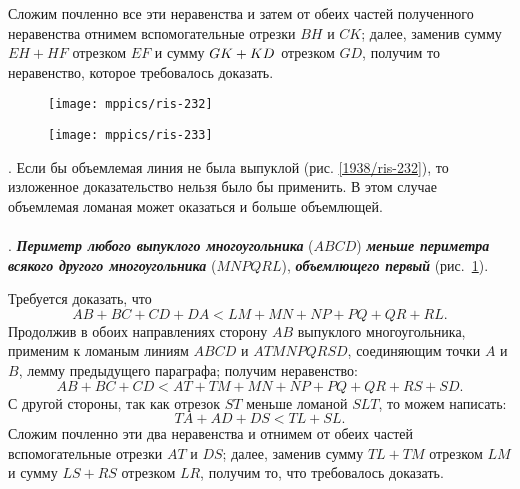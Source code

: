 Сложим почленно все эти неравенства и затем от обеих частей полученного неравенства отнимем вспомогательные отрезки $BH$ и $CK$;
далее, заменив сумму $EH+HF$ отрезком $EF$ и сумму $GK\z+KD$ отрезком $GD$, получим то неравенство, которое требовалось доказать.

\begin{figure}[h!]
\begin{minipage}{.48\textwidth}
\centering
\texttt{[image: mppics/ris-232]}
\end{minipage}\hfill
\begin{minipage}{.48\textwidth}
\centering
\texttt{[image: mppics/ris-233]}
\end{minipage}

\medskip

\begin{minipage}{.48\textwidth}
\centering
\caption{}\label{1938/ris-232}
\end{minipage}\hfill
\begin{minipage}{.48\textwidth}
\centering
\caption{}\label{1938/ris-233}
\end{minipage}
\vskip-4mm
\end{figure}

\smallskip
\mbox{.}
Если бы объемлемая линия не была выпуклой (рис. \ref{1938/ris-232}), то изложенное доказательство нельзя было бы применить.
В этом случае объемлемая ломаная может оказаться и больше объемлющей.

\paragraph{}\label{1938/233}
.
\textbf{\emph{Периметр любого выпуклого многоугольника}} ($ABCD$) \textbf{\emph{меньше периметра всякого другого многоугольника}} ($MNPQRL$), \textbf{\emph{объемлющего первый}} (рис.~\ref{1938/ris-233}).


Требуется доказать, что
\[AB+BC+CD+DA < LM+MN+NP+PQ+QR+RL.\]
Продолжив в обоих направлениях сторону $AB$ выпуклого многоугольника, применим к ломаным линиям $ABCD$ и $ATMNPQRSD$, соединяющим точки $A$ и $B$, лемму предыдущего параграфа;
получим неравенство:
\[AB+BC+CD<AT+TM+MN+NP+PQ+QR+RS+SD.\]
С другой стороны, так как отрезок $ST$ меньше ломаной $SLT$, то можем написать:
\[TA+AD+DS<TL+SL.\]
Сложим почленно эти два неравенства и отнимем от обеих частей вспомогательные отрезки $AT$ и $DS$;
далее, заменив сумму $TL+TM$ отрезком $LM$ и сумму $LS+RS$ отрезком $LR$, получим то, что требовалось доказать.

